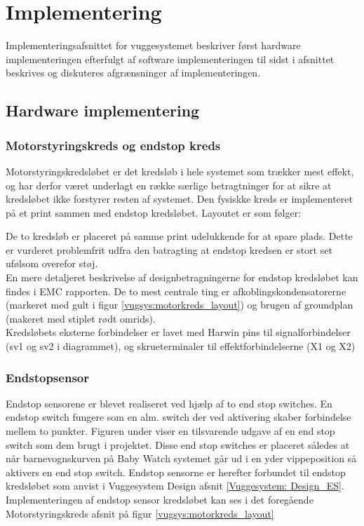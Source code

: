 \section{Implementering}
\label{Vuggesystem: Implementering} 
Implementeringsafsnittet for vuggesystemet beskriver først hardware implementeringen efterfulgt af software implementeringen til sidst i afsnittet beskrives og diskuteres afgrænsninger af implementeringen.
\subsection{Hardware implementering}
\subsubsection{Motorstyringskreds og endstop kreds}
Motorstyringskredsløbet er det kredsløb i hele systemet som trækker mest effekt, og har derfor været underlagt en række særlige betragtninger for at sikre at kredsløbet ikke forstyrer resten af systemet. Den fysiskke kreds er implementeret på et print sammen med endstop kredsløbet. Layoutet er som følger:


De to kredsløb er placeret på samme print udelukkende for at spare plads. Dette er vurderet problemfrit udfra den batragting at endstop kredsen er stort set ufølsom overefor støj.\\

En mere detaljeret beskrivelse af designbetragningerne for endstop kredsløbet kan findes i EMC rapporten. De to mest centrale ting er afkoblingskondensatorerne (markeret med gult i figur \ref{vugsys:motorkreds_layout}) og brugen af groundplan (makeret med stiplet rødt omrids). \\

Kredsløbets eksterne forbindelser er lavet med Harwin pins til signalforbindelser (sv1 og sv2 i diagrammet), og skrueterminaler til effektforbindelserne (X1 og X2)

\newpage
\subsubsection{Endstopsensor}\label{Vuggesystem: Implementering_ES} 
Endstop sensorene er blevet realiseret ved hjælp af to end stop switches. En endstop switch fungere som en alm. switch der ved aktivering skaber forbindelse mellem to punkter. Figuren under viser en tilsvarende udgave af en end stop switch som dem brugt i projektet.
 Disse end stop switches er placeret således at når barnevognskurven på Baby Watch systemet går ud i en yder vippeposition så aktivers en end stop switch.
Endstop sensorne er herefter forbundet til endstop kredsløbet som anvist i Vuggesystem Design afsnit \vref{Vuggesystem: Design_ES}. \\
Implementeringen af endstop sensor kredsløbet kan ses i det foregående Motorstyringskreds afsnit på figur \vref{vugsys:motorkreds_layout}
\newpage
